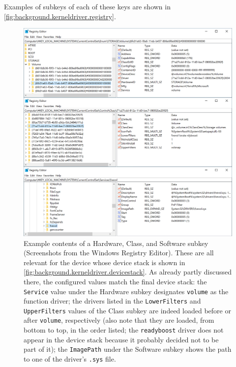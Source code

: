 Examples of subkeys of each of these keys are shown in \autoref{fig:background.kerneldriver.registry}.

\begin{figure}[htb!]
	\center
	
	\includegraphics[scale=0.65]{../img/background.kerneldriver.registry.png}
	\caption[
		Example contents of a Hardware, Class, and Software subkey
	]{
		Example contents of a Hardware, Class, and Software subkey (Screenshots from the Windows Registry Editor). These are all relevant for the device whose device stack is shown in \autoref{fig:background.kerneldriver.devicestack}. As already partly discussed there, the configured values match the final device stack: the \texttt{Service} value under the Hardware subkey designates \texttt{volume} as the function driver; the drivers listed in the \texttt{LowerFilters} and \texttt{UpperFilters} values of the Class subkey are indeed loaded before or after \texttt{volume}, respectively (also note that they are loaded, from bottom to top, in the order listed; the \texttt{readyboost} driver does not appear in the device stack because it probably decided not to be part of it\footnotemark); the \texttt{ImagePath} under the Software subkey shows the path to one of the driver's \texttt{.sys} file.
	}
	\label{fig:background.kerneldriver.registry}
\end{figure}

